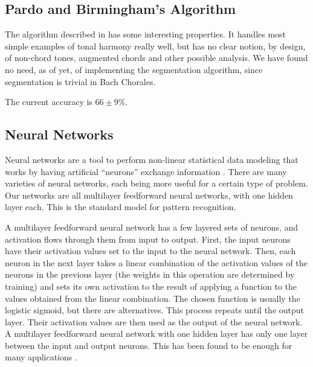 \documentclass{article}
\begin{document}
\subsection{Pardo and Birmingham's Algorithm}
\label{sec:pardo-birmingham}

The algorithm described in \cite{pardo99:automated} has some
interesting properties. It handles most simple examples of tonal
harmony really well, but has no clear notion, by design, of non-chord
tones, augmented chords and other possible analysis. We
have found no need, as of yet, of implementing the segmentation
algorithm, since segmentation is trivial in Bach Chorales.

The current accuracy is $66 \pm 9\%$.


\subsection{Neural Networks}
\label{sec:neural-nets}

Neural networks are a tool to perform non-linear statistical data
modeling that works by having artificial ``neurons'' exchange
information \cite{russell02:aima}. There are
many varieties of neural networks, each being more useful for a
certain type of problem. Our networks are all multilayer feedforward
neural networks, with one hidden layer each. This is the standard
model for pattern recognition.

A multilayer feedforward neural network has a few layered sets of
neurons, and activation flows through them from input to
output. First, the input neurons have their activation values set to
the input to the neural network. Then, each neuron in the next layer
takes a linear combination of the activation values of the neurons in
the previous layer (the weights in this operation are determined by
training) and sets its own activation to the result of applying a
function to the values obtained from the linear combination. The
chosen function is usually the logistic sigmoid, but there are
alternatives. This process repeats until the output layer. Their
activation values are then used as the output of the neural network. A
multilayer feedforward neural network with one hidden layer has only
one layer between the input and output neurons. This has been found to
be enough for many applications
\cite{russell02:aima}.
\end{document}
